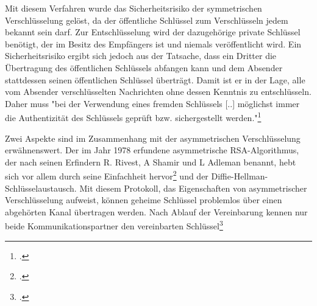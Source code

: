 \documentclass  [paper=a4,
				fontsize=12pt,
				listof=totoc,
				bibliography=totoc
				]{scrreprt}
\begin{document}
				Mit diesem Verfahren wurde das Sicherheitsrisiko der symmetrischen Verschlüsselung gelöst, da der öffentliche Schlüssel zum Verschlüsseln jedem bekannt sein darf. Zur Entschlüsselung wird der dazugehörige private Schlüssel benötigt, der im Besitz des Empfängers ist und niemals veröffentlicht wird.
				Ein Sicherheitsrisiko ergibt sich jedoch aus der Tatsache, dass ein Dritter die Übertragung des öffentlichen Schlüssels abfangen kann und dem Absender stattdessen seinen öffentlichen Schlüssel überträgt. Damit ist er in der Lage, alle vom Absender verschlüsselten Nachrichten ohne dessen Kenntnis zu entschlüsseln. Daher muss "bei der Verwendung eines fremden Schlüssels [..] möglichst immer die Authentizität des Schlüssels geprüft bzw. sichergestellt werden."\footcite[S. 90]{Ertel2012}
				
				Zwei Aspekte sind im Zusammenhang mit der asymmetrischen Verschlüsselung erwähnenswert. Der im Jahr 1978 erfundene asymmetrische RSA-Algorithmus, der nach seinen Erfindern R. Rivest, A Shamir und L Adleman benannt, hebt sich vor allem durch seine Einfachheit hervor\footcite[S. 79]{Ertel2012} und der Diffie-Hellman-Schlüsselaustausch. Mit diesem Protokoll, das Eigenschaften von asymmetrischer Verschlüsselung aufweist, können geheime Schlüssel problemlos über einen abgehörten Kanal übertragen werden. Nach Ablauf der Vereinbarung kennen nur beide Kommunikationspartner den vereinbarten Schlüssel\footcite[S. 129]{Stephan2011}
\end{document}
